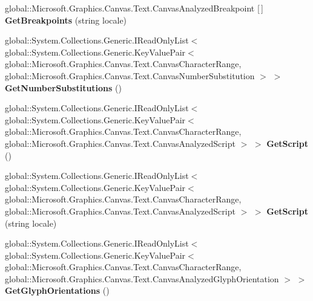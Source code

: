 \begin{DoxyCompactItemize}
global\+::\+Microsoft.\+Graphics.\+Canvas.\+Text.\+Canvas\+Analyzed\+Breakpoint \mbox{[}$\,$\mbox{]} {\bfseries Get\+Breakpoints} (string locale)
\item 
\mbox{\label{interface_microsoft_1_1_graphics_1_1_canvas_1_1_text_1_1_i_canvas_text_analyzer_a6d7def9fe8d3b06fcfe8ff52672a9ded}} 
global\+::\+System.\+Collections.\+Generic.\+I\+Read\+Only\+List$<$ global\+::\+System.\+Collections.\+Generic.\+Key\+Value\+Pair$<$ global\+::\+Microsoft.\+Graphics.\+Canvas.\+Text.\+Canvas\+Character\+Range, global\+::\+Microsoft.\+Graphics.\+Canvas.\+Text.\+Canvas\+Number\+Substitution $>$ $>$ {\bfseries Get\+Number\+Substitutions} ()
\item 
\mbox{\label{interface_microsoft_1_1_graphics_1_1_canvas_1_1_text_1_1_i_canvas_text_analyzer_af6e77ce224393b7d9086c00518fe11ff}} 
global\+::\+System.\+Collections.\+Generic.\+I\+Read\+Only\+List$<$ global\+::\+System.\+Collections.\+Generic.\+Key\+Value\+Pair$<$ global\+::\+Microsoft.\+Graphics.\+Canvas.\+Text.\+Canvas\+Character\+Range, global\+::\+Microsoft.\+Graphics.\+Canvas.\+Text.\+Canvas\+Analyzed\+Script $>$ $>$ {\bfseries Get\+Script} ()
\item 
\mbox{\label{interface_microsoft_1_1_graphics_1_1_canvas_1_1_text_1_1_i_canvas_text_analyzer_a49d7a00ef1aba0f0791869b786ee7738}} 
global\+::\+System.\+Collections.\+Generic.\+I\+Read\+Only\+List$<$ global\+::\+System.\+Collections.\+Generic.\+Key\+Value\+Pair$<$ global\+::\+Microsoft.\+Graphics.\+Canvas.\+Text.\+Canvas\+Character\+Range, global\+::\+Microsoft.\+Graphics.\+Canvas.\+Text.\+Canvas\+Analyzed\+Script $>$ $>$ {\bfseries Get\+Script} (string locale)
\item 
\mbox{\label{interface_microsoft_1_1_graphics_1_1_canvas_1_1_text_1_1_i_canvas_text_analyzer_a79f1fde65a69de1c7ae6d2697ced5aea}} 
global\+::\+System.\+Collections.\+Generic.\+I\+Read\+Only\+List$<$ global\+::\+System.\+Collections.\+Generic.\+Key\+Value\+Pair$<$ global\+::\+Microsoft.\+Graphics.\+Canvas.\+Text.\+Canvas\+Character\+Range, global\+::\+Microsoft.\+Graphics.\+Canvas.\+Text.\+Canvas\+Analyzed\+Glyph\+Orientation $>$ $>$ {\bfseries Get\+Glyph\+Orientations} ()

\end{DoxyCompactItemize}
